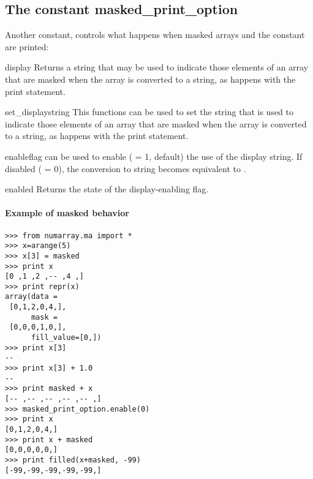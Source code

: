 \subsection{The constant masked_print_option}


Another constant,  controls what happens when
masked arrays and the constant
 are printed:

\begin{methoddesc}{display}{} 
   Returns a string that may be used to indicate those elements of an array
   that are masked when the array is converted to a string, as happens with the
   print statement.
\end{methoddesc}

\begin{methoddesc}{set_display}{string} 
   This functions can be used to set the string that is used to indicate those
   elements of an array that are masked when the array is converted to a
   string, as happens with the print statement.
\end{methoddesc}

\begin{methoddesc}{enable}{flag}
   can be used to enable ( = 1, default) the use of the display
   string. If disabled ( = 0), the conversion to string becomes
   equivalent to .
\end{methoddesc}

\begin{methoddesc}{enabled}{}
   Returns the state of the display-enabling flag.
\end{methoddesc}


\paragraph*{Example of masked behavior}
\label{sec:numarray.ma:example-mask-behavior}
\begin{verbatim}
>>> from numarray.ma import *
>>> x=arange(5)
>>> x[3] = masked
>>> print x
[0 ,1 ,2 ,-- ,4 ,]
>>> print repr(x)
array(data = 
 [0,1,2,0,4,],
      mask = 
 [0,0,0,1,0,],
      fill_value=[0,])
>>> print x[3]
--
>>> print x[3] + 1.0
--
>>> print masked + x
[-- ,-- ,-- ,-- ,-- ,]
>>> masked_print_option.enable(0)
>>> print x
[0,1,2,0,4,]
>>> print x + masked
[0,0,0,0,0,]
>>> print filled(x+masked, -99)
[-99,-99,-99,-99,-99,]
\end{verbatim}


